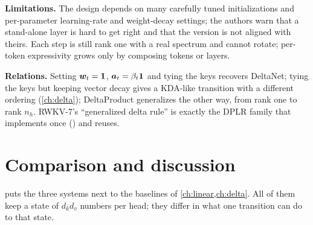\textbf{Limitations.} The design depends on many carefully tuned initializations and
per-parameter learning-rate and weight-decay settings; the authors warn that a stand-alone
layer is hard to get right and that the \fla{} version is not aligned with theirs. Each step
is still rank one with a real spectrum and cannot rotate; per-token expressivity grows only
by composing tokens or layers.

\textbf{Relations.} Setting $\bm{w}_t=\bm1$, $\bm{a}_t=\beta_t\bm1$ and tying the keys recovers
DeltaNet; tying the keys but keeping vector decay gives a KDA-like transition with a different
ordering (\cref{ch:delta}); DeltaProduct generalizes the other way, from rank one to rank
$n_h$. RWKV-7's ``generalized delta rule'' is exactly the DPLR family that \fla{} implements
once () and reuses.

\section{Comparison and discussion}\label{sec:c06-comparison}

 puts the three systems next to the baselines of
\cref{ch:linear,ch:delta}. All of them keep a state of $d_kd_v$ numbers per head; they
differ in what one transition can do to that state.


